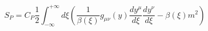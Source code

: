 \begin{equation}
S_P=C_P\frac{1}{2}\int_{-\infty}^{+\infty}d\xi
\left(\frac{1}{\beta(\xi)}g_{\mu\nu}(y) \frac{dy^\mu}{d\xi}
\frac{dy^\nu}{d\xi}-\beta(\xi)m^2 \right)
\end{equation}

